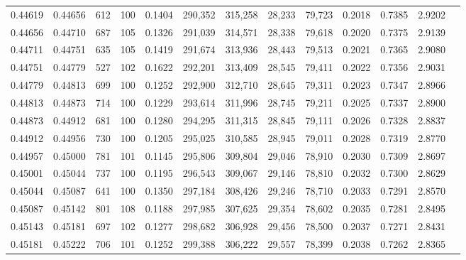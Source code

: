 \begin{tabular}{rrrrrrrrrrrrr}
0.44619 & 0.44656 &   612 & 100 &                                     0.1404 & 290,352 & 315,258 &  28,233 &  79,723 & 0.2018 & 0.7385 & 2.9202 \\
0.44656 & 0.44710 &   687 & 105 &                                     0.1326 & 291,039 & 314,571 &  28,338 &  79,618 & 0.2020 & 0.7375 & 2.9139 \\
0.44711 & 0.44751 &   635 & 105 &                                     0.1419 & 291,674 & 313,936 &  28,443 &  79,513 & 0.2021 & 0.7365 & 2.9080 \\
0.44751 & 0.44779 &   527 & 102 &                                     0.1622 & 292,201 & 313,409 &  28,545 &  79,411 & 0.2022 & 0.7356 & 2.9031 \\
0.44779 & 0.44813 &   699 & 100 &                                     0.1252 & 292,900 & 312,710 &  28,645 &  79,311 & 0.2023 & 0.7347 & 2.8966 \\
0.44813 & 0.44873 &   714 & 100 &                                     0.1229 & 293,614 & 311,996 &  28,745 &  79,211 & 0.2025 & 0.7337 & 2.8900 \\
0.44873 & 0.44912 &   681 & 100 &                                     0.1280 & 294,295 & 311,315 &  28,845 &  79,111 & 0.2026 & 0.7328 & 2.8837 \\
0.44912 & 0.44956 &   730 & 100 &                                     0.1205 & 295,025 & 310,585 &  28,945 &  79,011 & 0.2028 & 0.7319 & 2.8770 \\
0.44957 & 0.45000 &   781 & 101 &                                     0.1145 & 295,806 & 309,804 &  29,046 &  78,910 & 0.2030 & 0.7309 & 2.8697 \\
0.45001 & 0.45044 &   737 & 100 &                                     0.1195 & 296,543 & 309,067 &  29,146 &  78,810 & 0.2032 & 0.7300 & 2.8629 \\
0.45044 & 0.45087 &   641 & 100 &                                     0.1350 & 297,184 & 308,426 &  29,246 &  78,710 & 0.2033 & 0.7291 & 2.8570 \\
0.45087 & 0.45142 &   801 & 108 &                                     0.1188 & 297,985 & 307,625 &  29,354 &  78,602 & 0.2035 & 0.7281 & 2.8495 \\
0.45143 & 0.45181 &   697 & 102 &                                     0.1277 & 298,682 & 306,928 &  29,456 &  78,500 & 0.2037 & 0.7271 & 2.8431 \\
0.45181 & 0.45222 &   706 & 101 &                                     0.1252 & 299,388 & 306,222 &  29,557 &  78,399 & 0.2038 & 0.7262 & 2.8365 \\

\end{tabular}
